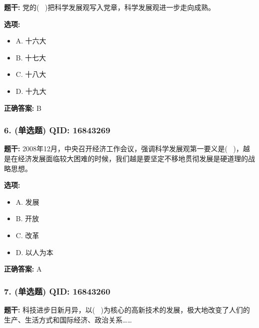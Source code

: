 \documentclass[12pt,UTF8]{ctexart}
\begin{document}
\textbf{题干:}
党的(  )把科学发展观写入党章，科学发展观进一步走向成熟。

\textbf{选项:}
\begin{itemize}[leftmargin=*]

  \item A. 十六大

  \item B. 十七大

  \item C. 十八大

  \item D. 十九大

\end{itemize}

\textbf{正确答案:}
B

\vspace{0.3em}\hrulefill\vspace{0.7em}

\subsubsection*{6. (单选题) \small QID: 16843269}

\textbf{题干:}
2008年12月，中央召开经济工作会议，强调科学发展观第一要义是(  )，越是在经济发展面临较大困难的时候，我们越是要坚定不移地贯彻发展是硬道理的战略思想。

\textbf{选项:}
\begin{itemize}[leftmargin=*]

  \item A. 发展

  \item B. 开放

  \item C. 改革

  \item D. 以人为本

\end{itemize}

\textbf{正确答案:}
A

\vspace{0.3em}\hrulefill\vspace{0.7em}

\subsubsection*{7. (单选题) \small QID: 16843260}

\textbf{题干:}
科技进步日新月异，以(  )为核心的高新技术的发展，极大地改变了人们的生产、生活方式和国际经济、政治关系……
\end{document}
